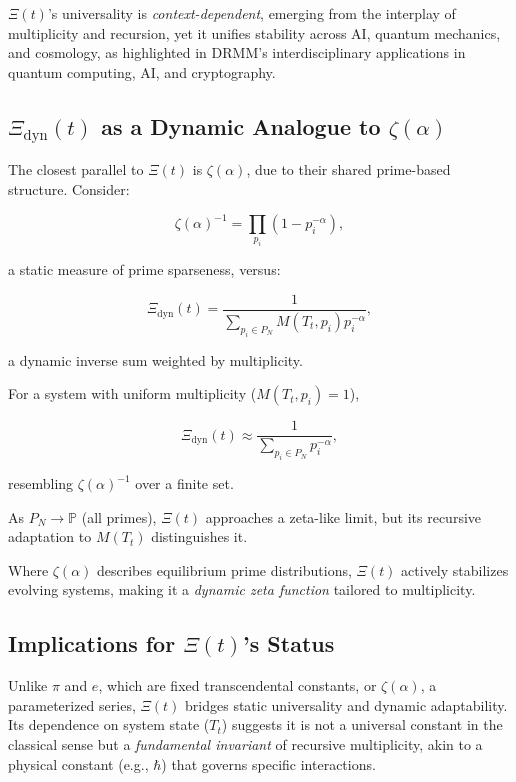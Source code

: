 \documentclass{article}
\theoremstyle{plain}
\begin{document}
\begin{itemize}
\(\Xi(t) \)'s universality is \textit{context-dependent}, emerging from the interplay of multiplicity and recursion, yet it unifies stability across AI, quantum mechanics, and cosmology, as highlighted in DRMM's interdisciplinary applications in quantum computing, AI, and cryptography.

\subsection{\(\Xi_{\text{dyn}}(t)\) as a Dynamic Analogue to \( \zeta(\alpha) \)}

The closest parallel to \(\Xi(t) \) is \( \zeta(\alpha) \), due to their shared prime-based structure. Consider:

\[
\zeta(\alpha)^{-1} = \prod_{p_i} (1 - p_i^{-\alpha}),
\]

a static measure of prime sparseness, versus:

\[
\Xi_{\text{dyn}}(t) = \frac{1}{\sum_{p_i \in P_N} M(T_t, p_i) p_i^{-\alpha}},
\]

a dynamic inverse sum weighted by multiplicity.

For a system with uniform multiplicity (\( M(T_t, p_i) = 1 \)),

\[
\Xi_{\text{dyn}}(t) \approx \frac{1}{\sum_{p_i \in P_N} p_i^{-\alpha}},
\]

resembling \( \zeta(\alpha)^{-1} \) over a finite set.

As \( P_N \to \mathbb{P} \) (all primes), \(\Xi(t) \) approaches a zeta-like limit, but its recursive adaptation to \( M(T_t) \) distinguishes it. 

Where \( \zeta(\alpha) \) describes equilibrium prime distributions, \(\Xi(t) \) actively stabilizes evolving systems, making it a \textit{dynamic zeta function} tailored to multiplicity.

\subsection{Implications for \(\Xi(t) \)'s Status}

Unlike \( \pi \) and \( e \), which are fixed transcendental constants, or \( \zeta(\alpha) \), a parameterized series, \(\Xi(t) \) bridges static universality and dynamic adaptability. Its dependence on system state (\( T_t \)) suggests it is not a universal constant in the classical sense but a \textit{fundamental invariant} of recursive multiplicity, akin to a physical constant (e.g., \( \hbar \)) that governs specific interactions.


\end{itemize}
\end{document}
